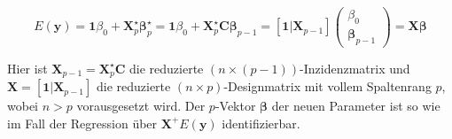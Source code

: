 %

\begin{equation*}
E(\bm{y}) = \bm{1} \beta_{0} + \bm{X}_{p}^{\star} \bm{\beta}_{p}^{\star} = \bm{1} \beta_{0} + \bm{X}_{p}^{\star} \bm{C} \bm{\beta}_{p-1} = [\bm{1}|\bm{X}_{p-1}] \left(\begin{array}{l} \beta_{0} \\ \bm{\beta}_{p-1} \end{array}\right) = \bm{X} \bm{\beta}
\end{equation*}

Hier ist $\bm{X}_{p-1} = \bm{X}_{p}^{\star} \bm{C}$ die reduzierte $(n \times (p-1))$-Inzidenzmatrix und $\bm{X} = [\bm{1}|\bm{X}_{p-1}]$ die reduzierte $(n \times p)$-Designmatrix mit vollem Spaltenrang $p$, wobei $n > p$ vorausgesetzt wird. Der $p$-Vektor $\bm{\beta}$ der neuen Parameter ist so wie im Fall der Regression über $\bm{X}^{+} E(\bm{y})$ identifizierbar.

